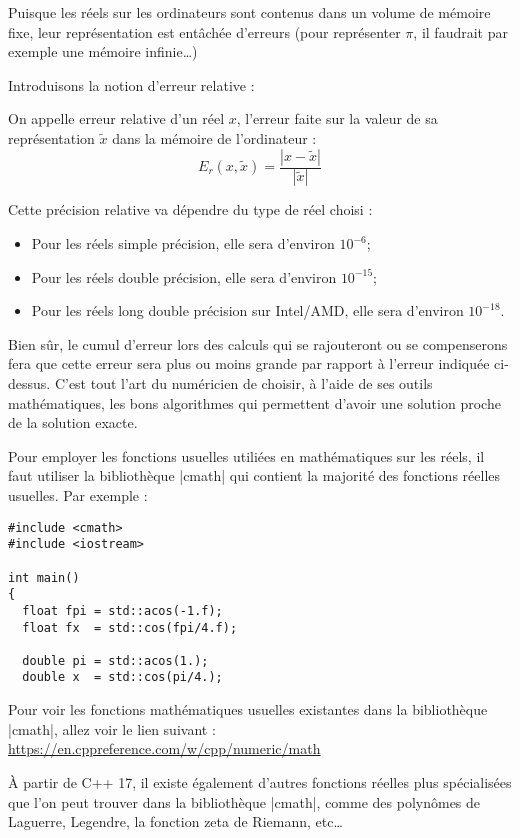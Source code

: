 Puisque les réels sur les ordinateurs sont contenus dans un volume de mémoire fixe, leur représentation est entâchée d'erreurs (pour représenter $\pi$, il faudrait par exemple une mémoire infinie\ldots)

Introduisons la notion d'erreur relative :
\begin{defn}
On appelle erreur relative d'un réel $x$, l'erreur faite sur la valeur de sa représentation $\tilde x$ dans la mémoire de l'ordinateur :
\[
E_{r}(x,{\tilde x}) = \frac{\left\lvert x - {\tilde x}\right\rvert}{\left\lvert{\tilde x}\right\rvert}
\]
\end{defn}

Cette précision relative va dépendre du type de réel choisi :
\begin{itemize}
  \item Pour les réels simple précision, elle sera d'environ $10^{-6}$;
  \item Pour les réels double précision, elle sera d'environ $10^{-15}$;
  \item Pour les réels long double précision sur Intel/AMD, elle sera d'environ $10^{-18}$.
\end{itemize}

Bien sûr, le cumul d'erreur lors des calculs qui se rajouteront ou se compenserons fera que cette erreur sera plus ou moins grande par rapport à l'erreur indiquée ci-dessus. C'est tout l'art du numéricien de choisir, à l'aide de ses outils mathématiques, les bons algorithmes qui permettent d'avoir une solution proche de la solution exacte.

Pour employer les fonctions usuelles utiliées en mathématiques sur les réels, il faut utiliser la bibliothèque |cmath|
qui contient la majorité des fonctions réelles usuelles. Par exemple :

\begin{lstlisting}
#include <cmath>
#include <iostream>

int main()
{
  float fpi = std::acos(-1.f);
  float fx  = std::cos(fpi/4.f);

  double pi = std::acos(1.);
  double x  = std::cos(pi/4.);
\end{lstlisting}

Pour voir les fonctions mathématiques usuelles existantes dans la bibliothèque |cmath|, allez voir le lien suivant :
\url{https://en.cppreference.com/w/cpp/numeric/math}

À partir de C++ 17, il existe également d'autres fonctions réelles plus spécialisées que l'on peut trouver dans
la bibliothèque |cmath|, comme des polynômes de Laguerre, Legendre, la fonction zeta de Riemann, etc\ldots

